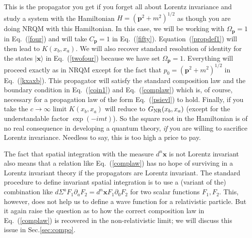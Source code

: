 \documentclass{article}
\def\eq#1{{Eq.~(\ref{#1})}}
\def\ket#1{|#1\rangle}                    %
\begin{document}
This is the propagator you get if you forget all about Lorentz invariance and study a system with the Hamiltonian $H=(\bm{p}^2 + m^2)^{1/2}$ as though you are doing NRQM with this Hamiltonian. In this case,  we will be working with   $\Omega_{\bm p}=1$ in \eq{four} and will take $C_{\bm p}=1$ in \eq{fifty}. Equation~(\ref{propdef1}) will then lead to $K(x_b,x_a)$. We will also recover standard resolution of identity for the states $\ket{\bm{x}}$ in \eq{twofour} because we have set $\Omega_{\bm{p}} =1$. Everything will proceed exactly as in NRQM except for the fact that $p_0=(\bm{p}^2+m^2)^{1/2}$ in \eq{kxaxb}. This propagator will satisfy the standard composition law and the boundary condition in \eq{coin1} and \eq{complaw} which is, of course, necessary for a propagation law of the form \eq{psievl} to hold. Finally, if you take the $c\to \infty$ limit $K(x_b,x_a)$ will reduce to $G_{\rm NR}(x_b,x_a)$ (except for the understandable factor $\exp(-imt)$). So the square root in the Hamiltonian is of no real consequence in developing a quantum theory, \textit{if} you are willing to sacrifice Lorentz invariance. Needless to say, this is too high a price to pay. 

The fact that spatial integration with the measure $ d^n \bm{x}$
 is not Lorentz invariant also means that a relation like \eq{complaw} has no hope of surviving in a Lorentz invariant theory if the propagators are Lorentz invariant. The standard procedure to define invariant spatial integration is to use a (variant of the) combination like $d\Sigma^a F_1\partial_a F_2 =  d^n \bm{x} F_1\partial_0 F_2$ for two scalar functions $F_1,F_2$. This, however, does not help us to define a wave function for a relativistic particle. But it again raise the question as to how the correct composition law in \eq{complaw} is recovered in the non-relativistic limit; we will discuss this issue in Sec.\ref{sec:compo}.
 
\end{document}

